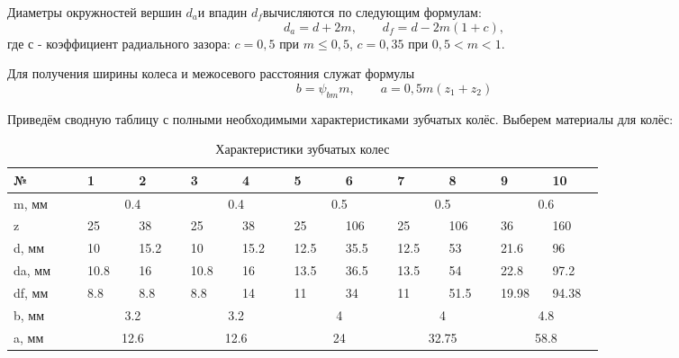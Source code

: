 \documentclass[14pt,a4paper,russian]{scrartcl}
\begin{document}
        Диаметры окружностей вершин \( d_a \)и впадин \( d_f \)вычисляются по следующим формулам:
        \[ d_a = d + 2m,\qquad d_f = d - 2m(1+c),\]
        где с - коэффициент радиального зазора: 
            \( c=0,5 \) при \( m\leq 0,5 \), \( c=0,35 \) при \( 0,5<m<1 \).
        
        Для получения ширины колеса и межосевого расстояния служат формулы
        \[ b=\psi_{bm}m, \qquad  a = 0,5m(z_1+z_2)\]
        
        Приведём сводную таблицу с полными необходимыми характеристиками зубчатых колёс.
        Выберем материалы для колёс:
        \begin{table}[h!]
            \begin{center}
                \begin{tabular}{p{0.1\linewidth}|p{0.07\linewidth}p{0.07\linewidth}p{0.07\linewidth}p{0.07\linewidth}p{0.07\linewidth}p{0.07\linewidth}p{0.07\linewidth}p{0.07\linewidth}p{0.07\linewidth}p{0.07\linewidth}}
                    \hline
                    №   & 1&2&3&4&5&6&7&8&9&10\\
                    \hline
                    m, мм  & \multicolumn{2}{c}{0.4} & \multicolumn{2}{c}{0.4} & \multicolumn{2}{c}{0.5} & \multicolumn{2}{c}{0.5} & \multicolumn{2}{c}{0.6} \\
                    z       & 25 &  38 &  25 &  38 &  25 & 106 &   25 &  106 &  36 &  160 \\
                    d, мм   & 10 &  15.2 &  10 &  15.2 &  12.5 & 35.5 &   12.5 &  53 &  21.6 &  96 \\
                    da, мм  & 10.8 & 16 & 10.8 & 16 & 13.5 & 36.5 & 13.5 & 54 & 22.8 & 97.2 \\
                    df, мм  & 8.8 & 8.8 & 8.8 & 14 & 11 & 34 & 11 & 51.5 & 19.98 & 94.38 \\
                    b, мм & \multicolumn{2}{c}{3.2} &  \multicolumn{2}{c}{3.2} &  \multicolumn{2}{c}{4} & \multicolumn{2}{c}{4} &\multicolumn{2}{c}{4.8} \\
                    a, мм & \multicolumn{2}{c}{12.6} & \multicolumn{2}{c}{12.6} & \multicolumn{2}{c}{24} & \multicolumn{2}{c}{32.75} & \multicolumn{2}{c}{58.8} \\
                    \hline
                \end{tabular}
                \caption{{Характеристики зубчатых колес}}\label{tab:gears_digest}
            \end{center}
        \end{table}
\end{document}
